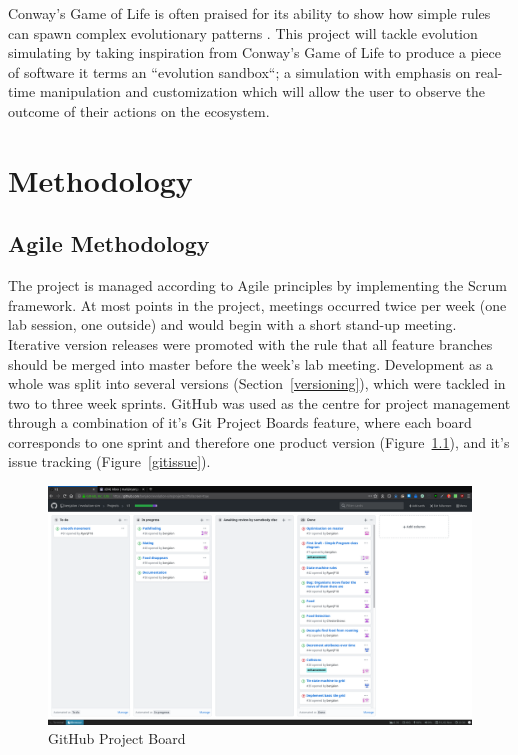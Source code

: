 \documentclass[a4paper, oneside, 11pt]{report}
\begin{document}
Conway's Game of Life is often praised for its ability to show how simple rules can spawn complex evolutionary patterns \cite{callahan}. This project will tackle evolution simulating by taking inspiration from Conway's Game of Life to produce a piece of software it terms an ``evolution sandbox``; a simulation with emphasis on real-time manipulation and customization which will allow the user to observe the outcome of their actions on the ecosystem.

\chapter{Methodology}\label{methodology}

\section{Agile Methodology}\label{projectmanagement}
The project is managed according to Agile principles by implementing the Scrum framework. At most points in the project, meetings occurred twice per week (one lab session, one outside) and would begin with a short stand-up meeting. Iterative version releases were promoted with the rule that all feature branches should be merged into master before the week's lab meeting. Development as a whole was split into several versions (Section~\ref{versioning}), which were tackled in two to three week sprints. GitHub was used as the centre for project management through a combination of it's Git Project Boards feature, where each board corresponds to one sprint and therefore one product version (Figure~\ref{gitboard}), and it's issue tracking (Figure~\ref{gitissue}). 

\begin{figure}[H]
	\caption{GitHub Project Board}\label{gitboard}
	\centering
	\includegraphics[width=1\textwidth]{gitproj}
\end{figure}
\end{document}
